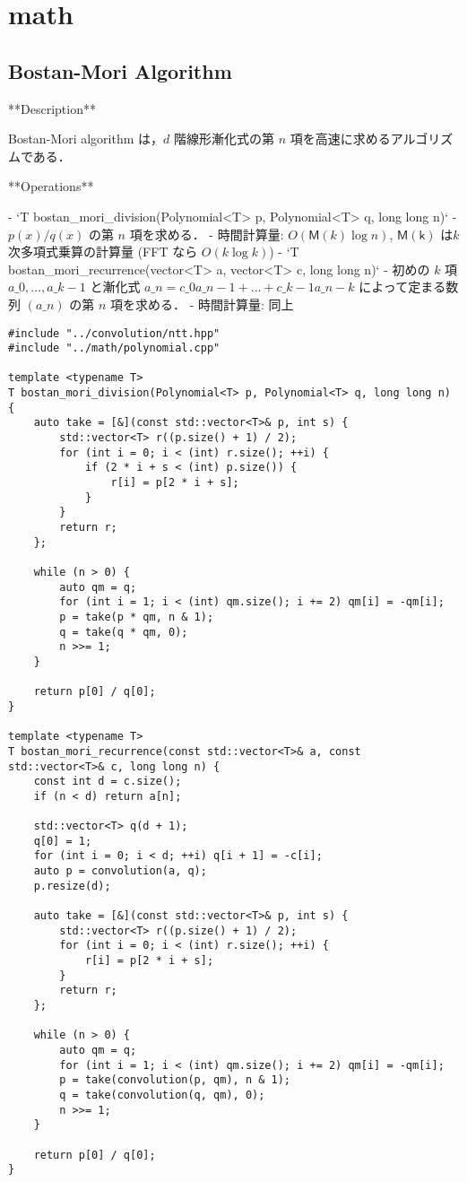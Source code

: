 \section{math}

\subsection{Bostan-Mori Algorithm}

\begin{small}
\begin{markdown}
**Description**

Bostan-Mori algorithm は，$d$ 階線形漸化式の第 $n$ 項を高速に求めるアルゴリズムである．

**Operations**

- `T bostan\_mori\_division(Polynomial<T> p, Polynomial<T> q, long long n)`
    - $p(x)/q(x)$ の第 $n$ 項を求める．
    - 時間計算量: $O(\mathsf{M}(k) \log n)$, $\mathsf{M(k)}$ は$k$次多項式乗算の計算量 (FFT なら $O(k\log k)$)
- `T bostan\_mori\_recurrence(vector<T> a, vector<T> c, long long n)`
    - 初めの $k$ 項 $a\_0, \dots, a\_{k-1}$ と漸化式 $a\_n = c\_0 a\_{n-1} + \dots + c\_{k-1} a\_{n-k}$ によって定まる数列 $(a\_n)$ の第 $n$ 項を求める．
    - 時間計算量: 同上

\end{markdown}
\end{small}

\begin{lstlisting}
#include "../convolution/ntt.hpp"
#include "../math/polynomial.cpp"

template <typename T>
T bostan_mori_division(Polynomial<T> p, Polynomial<T> q, long long n) {
    auto take = [&](const std::vector<T>& p, int s) {
        std::vector<T> r((p.size() + 1) / 2);
        for (int i = 0; i < (int) r.size(); ++i) {
            if (2 * i + s < (int) p.size()) {
                r[i] = p[2 * i + s];
            }
        }
        return r;
    };

    while (n > 0) {
        auto qm = q;
        for (int i = 1; i < (int) qm.size(); i += 2) qm[i] = -qm[i];
        p = take(p * qm, n & 1);
        q = take(q * qm, 0);
        n >>= 1;
    }

    return p[0] / q[0];
}

template <typename T>
T bostan_mori_recurrence(const std::vector<T>& a, const std::vector<T>& c, long long n) {
    const int d = c.size();
    if (n < d) return a[n];

    std::vector<T> q(d + 1);
    q[0] = 1;
    for (int i = 0; i < d; ++i) q[i + 1] = -c[i];
    auto p = convolution(a, q);
    p.resize(d);

    auto take = [&](const std::vector<T>& p, int s) {
        std::vector<T> r((p.size() + 1) / 2);
        for (int i = 0; i < (int) r.size(); ++i) {
            r[i] = p[2 * i + s];
        }
        return r;
    };

    while (n > 0) {
        auto qm = q;
        for (int i = 1; i < (int) qm.size(); i += 2) qm[i] = -qm[i];
        p = take(convolution(p, qm), n & 1);
        q = take(convolution(q, qm), 0);
        n >>= 1;
    }

    return p[0] / q[0];
}
\end{lstlisting}